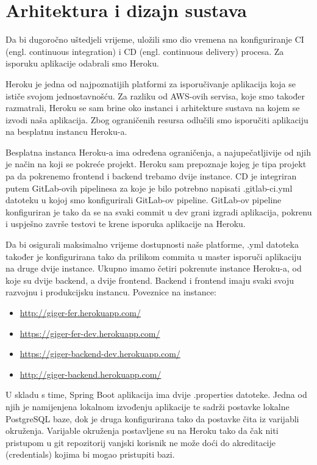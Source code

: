 \chapter{Arhitektura i dizajn sustava}
		
	Da bi dugoročno uštedjeli vrijeme, uložili smo dio vremena na konfiguriranje CI (engl. continuous integration) i CD (engl. continuous delivery) procesa. Za isporuku aplikacije odabrali smo Heroku.
	
	Heroku je jedna od najpoznatijih platformi za isporučivanje aplikacija koja se ističe svojom jednostavnošću. Za razliku od AWS-ovih servisa, koje smo također razmatrali, Heroku se sam brine oko instanci i arhitekture sustava na kojem se izvodi naša aplikacija. Zbog ograničenih resursa odlučili smo isporučiti aplikaciju na besplatnu instancu Heroku-a.
	
	Besplatna instanca Heroku-a ima određena ograničenja, a najupečatljivije od njih je način na koji se pokreće projekt.
	Heroku sam prepoznaje kojeg je tipa projekt pa da pokrenemo frontend i backend trebamo dvije instance.
	CD je integriran putem GitLab-ovih pipelinesa za koje je bilo potrebno napisati .gitlab-ci.yml datoteku u kojoj smo konfigurirali GitLab-ov pipeline. GitLab-ov pipeline konfiguriran je tako da se na svaki commit u dev grani izgradi aplikacija, pokrenu i uspješno završe testovi te krene isporuka aplikacije na Heroku.
	
	Da bi osigurali maksimalno vrijeme dostupnosti naše platforme, .yml datoteka također je konfigurirana tako da prilikom commita u master isporuči aplikaciju na druge dvije instance.
	Ukupno imamo četiri pokrenute instance Heroku-a, od koje su dvije backend, a dvije frontend. Backend i frontend imaju svaki svoju razvojnu i produkcijsku instancu. Poveznice na instance:
	\begin{itemize}
		\item \url{http://giger-fer.herokuapp.com/}
		\item \url{https://giger-fer-dev.herokuapp.com/}
		\item \url{https://giger-backend-dev.herokuapp.com/}
		\item \url{http://giger-backend.herokuapp.com/}
	\end{itemize}
	
	
	U skladu s time, Spring Boot aplikacija ima dvije .properties datoteke. Jedna od njih je namijenjena lokalnom izvođenju aplikacije te sadrži postavke lokalne PostgreSQL baze, dok je druga konfigurirana tako da postavke čita iz varijabli okruženja. Varijable okruženja postavljene su na Heroku tako da čak niti pristupom u git repozitorij vanjski korisnik ne može doći do akreditacije (credentials) kojima bi mogao pristupiti bazi.
	
